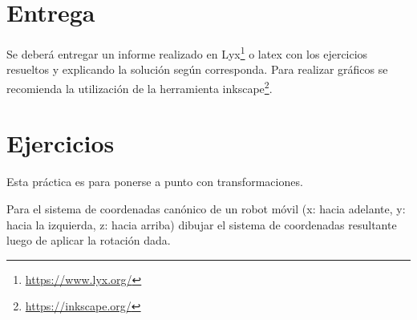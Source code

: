 \documentclass[tp]{lcc}
\begin{document}
\maketitle

\section{Entrega}
Se deberá entregar un informe realizado en Lyx\footnote{\url{https://www.lyx.org/}} o latex con los ejercicios resueltos y explicando la solución según corresponda. Para realizar gráficos se recomienda la utilización de la herramienta inkscape\footnote{\url{https://inkscape.org/}}.

\section{Ejercicios}
Esta práctica es para ponerse a punto con transformaciones.

\ejercicio Para el sistema de coordenadas canónico de un robot móvil (x: hacia adelante, y: hacia la izquierda, z: hacia arriba) dibujar el sistema de coordenadas resultante luego de aplicar la rotación dada.

    \begin{figure}[!h]
    \centering
    \hspace{-4cm}
    \hspace{3cm}
    \subfloat[$R_{y}(\SI{90}{\degree})$]
    {
        
    }
    \hspace{3cm}
    \hspace{3cm}
    \end{figure}
\end{document}
